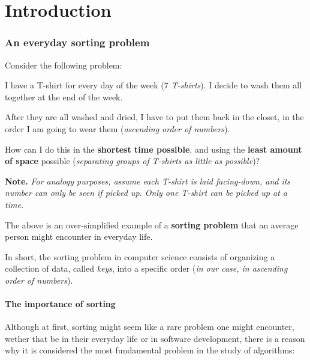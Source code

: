 \documentclass[a4paper]{article}
\begin{document}
    \newpage

    \tableofcontents

    \newpage
    \part{Introduction}
    \section{An everyday sorting problem}
        Consider the following problem:

        \begin{framed}
            {\selectfont
            I have a T-shirt for every day of the week (\emph{\(7\) T-shirts}). I decide to wash them all together at the end of the week. 
            
            After they are all washed and dried, I have to put them back in the closet, in the order I am going to wear them (\emph{ascending order of numbers}). 
            
            How can I do this in the \textbf{shortest time possible}, and using the \textbf{least amount of space} possible (\emph{separating groups of T-shirts as little as possible})?
            \vspace*{1em}

            \noindent \textbf{Note.} \textit{For analogy purposes, assume each T-shirt is laid facing-down, and its number can only be seen if picked up. Only one T-shirt can be picked up at a time.}
            }
        \end{framed}

        \noindent The above is an over-simplified example of a \textbf{sorting problem} that an average person might encounter in everyday life.

        In short, the sorting problem in computer science consists of organizing a collection of data, called \emph{keys}, into a specific order (\emph{in our case, in ascending order of numbers}).

        \subsection{The importance of sorting}

            Although at first, sorting might seem like a rare problem one might encounter, wether that be in their everyday life or in software development, there is a reason why it is considered the most fundamental problem in the study of algorithms:
\end{document}

